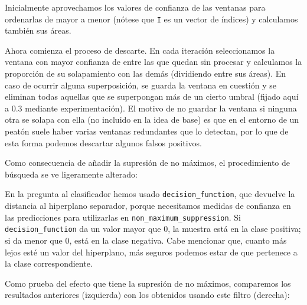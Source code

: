 \documentclass[11pt,a4paper]{article}
\begin{document}

                \par
                Inicialmente aprovechamos los valores de confianza de las ventanas para ordenarlas de mayor a menor (nótese que \texttt{I} es un vector de índices) y calculamos también sus áreas.

                \par
                Ahora comienza el proceso de descarte. En cada iteración seleccionamos la ventana con mayor confianza de entre las que quedan sin procesar y calculamos la proporción de su solapamiento con las demás (dividiendo entre sus áreas). En caso de ocurrir alguna superposición, se guarda la ventana en cuestión y se eliminan todas aquellas que se superpongan más de un cierto umbral (fijado aquí a 0.3 mediante experimentación). El motivo de no guardar la ventana si ninguna otra se solapa con ella (no incluido en la idea de base) es que en el entorno de un peatón suele haber varias ventanas redundantes que lo detectan, por lo que de esta forma podemos descartar algunos falsos positivos.

                \par
                Como consecuencia de añadir la supresión de no máximos, el procedimiento de búsqueda se ve ligeramente alterado:


                \par
                En la pregunta al clasificador hemos usado \texttt{decision\_function}, que devuelve la distancia al hiperplano separador, porque necesitamos medidas de confianza en las predicciones para utilizarlas en \texttt{non\_maximum\_suppression}. Si \texttt{decision\_function} da un valor mayor que 0, la muestra está en la clase positiva; si da menor que 0, está en la clase negativa. Cabe mencionar que, cuanto más lejos esté un valor del hiperplano, más seguros podemos estar de que pertenece a la clase correspondiente.

                \par
                Como prueba del efecto que tiene la supresión de no máximos, comparemos los resultados anteriores (izquierda) con los obtenidos usando este filtro (derecha):
\end{document}
